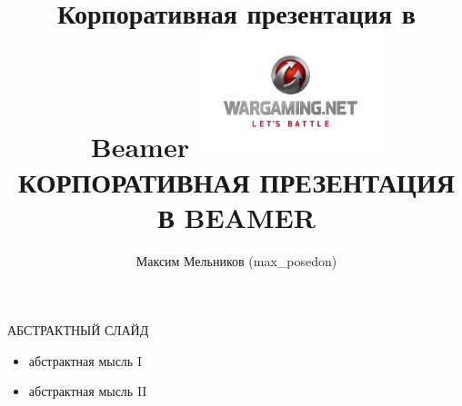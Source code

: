 \documentclass[aspectratio=169]{beamer}
\begin{document}
\title{Корпоративная презентация в Beamer}
\author{Максим Мельников (max\_posedon)}
\date{}














% 
{
\title{
    \includegraphics[width=0.4\textwidth]{wg-logo.png}\\
    {\Huge КОРПОРАТИВНАЯ ПРЕЗЕНТАЦИЯ\\В BEAMER}
}

\begin{frame}[plain]{}
    \titlepage
\end{frame}
}








\begin{frame}{АБСТРАКТНЫЙ СЛАЙД}
    \begin{itemize}
        \item абстрактная мысль I
        \item абстрактная мысль II
    \end{itemize}
\end{frame}
\end{document}
